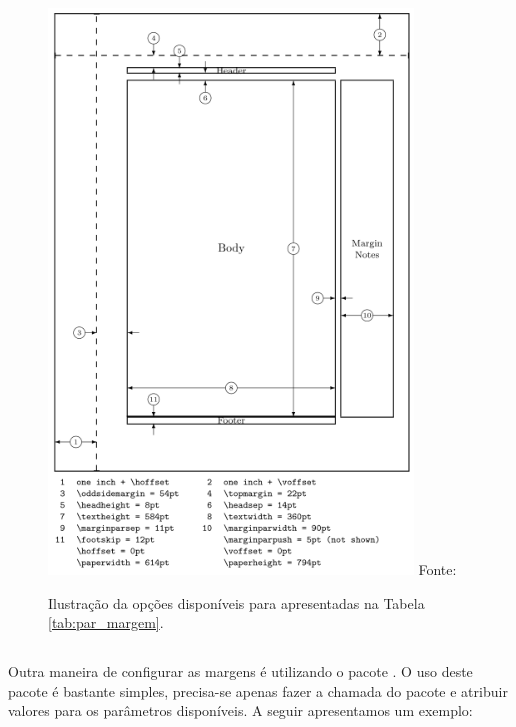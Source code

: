 \begin{figure}[h!]
    \centering
    \includegraphics[height=15cm]{figures/margin.png}
    \flushright Fonte: \cite{Graetzer:2007:MoreMath}
    \caption{Ilustração da opções disponíveis para  apresentadas na Tabela \ref{tab:par_margem}.} \label{fig:par_margem}
\end{figure}

\subsection{}

Outra maneira de configurar as margens é utilizando o pacote . O uso deste pacote é bastante simples, precisa-se apenas fazer a chamada do pacote e atribuir valores para os parâmetros disponíveis. A seguir apresentamos um exemplo:
\begin{latexcode}
    \usepackage{geometry}
    \geometry{parameter = length, ...}
\end{latexcode}

